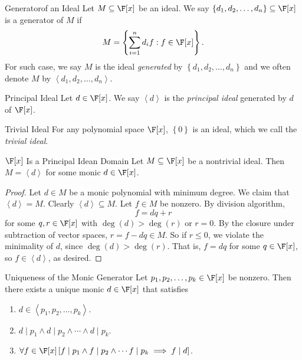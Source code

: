 \documentclass[linearalgebra]{subfiles}
\begin{document}
    \begin{definition}{Generator}{of an Ideal}
        Let $M\subseteq \F[x]$ be an ideal. We say $\left\lbrace d_1, d_2, \ldots, d_n \right\rbrace \subseteq \F[x]$ is a generator of $M$ if
        \begin{equation*}
            M = \left\lbrace \sum^{n}_{i=1} d_if : f\in \F[x] \right\rbrace.
        \end{equation*}
        For such case, we say $M$ is the ideal \emph{generated} by $\left\lbrace d_1, d_2, \ldots, d_n \right\rbrace$ and we often denote $M$ by $\left< d_1, d_2, \ldots, d_n \right>$.
    \end{definition}

    \begin{definition}{Principal Ideal}{}
        Let $d\in \F[x]$. We say $\left<d\right>$ is the \emph{principal ideal} generated by $d$ of $\F[x]$.
    \end{definition}

    \begin{definition}{Trivial Ideal}{}
        For any polynomial space $\F[x]$, $\left\lbrace 0 \right\rbrace$ is an ideal, which we call the \emph{trivial ideal}.
    \end{definition}

    \begin{prop}{$\F[x]$ Is a Principal Idean Domain}
        Let $M\subseteq \F[x]$ be a nontrivial ideal. Then $M = \left<d\right>$ for some monic $d\in \F[x]$.
    \end{prop}

    \begin{proof}
        Let $d\in M$ be a monic polynomial with minimum degree. We claim that $\left< d \right> = M$. Clearly $\left< d \right> \subseteq M$. Let $f\in M$ be nonzero. By division algorithm,
        \begin{equation*}
            f = dq+r
        \end{equation*}
        for some $q,r\in \F[x]$ with $\deg(d) > \deg(r)$ or $r = 0$. By the closure under subtraction of vector spaces, $r = f-dq\in M$. So if $r\leq 0$, we violate the minimality of $d$, since $\deg(d) > \deg(r)$. That is, $f = dq$ for some $q\in \F[x]$, so $f\in \left< d \right>$, as desired. 
    \end{proof}

    \begin{cor}{Uniqueness of the Monic Generator}
        Let $p_1, p_2, \ldots, p_k\in \F[x]$ be nonzero. Then there exists a unique monic $d\in \F[x]$ that satisfies
        \begin{enumerate}
            \item $d\in \left< p_1, p_2, \ldots, p_k \right>$.  
            \item $d\mid p_1\land d\mid p_2\land \cdots \land d\mid p_k$.
            \item $\forall f\in \F[x] \left[ f\mid p_1\land f\mid p_2\land \cdots f\mid p_k \implies f\mid d \right]$. 
        \end{enumerate}
    \end{cor}	
\end{document}
